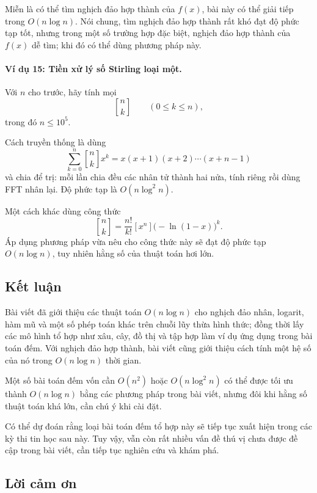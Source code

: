 \documentclass[11pt]{article}
\begin{document}
Miễn là có thể tìm nghịch đảo hợp thành của \(f(x)\), bài này có thể giải tiếp
trong \(O(n\log n)\). Nói chung, tìm nghịch đảo hợp thành rất khó đạt độ phức
tạp tốt, nhưng trong một số trường hợp đặc biệt, nghịch đảo hợp thành của
\(f(x)\) dễ tìm; khi đó có thể dùng phương pháp này.

\paragraph{Ví dụ 15: Tiền xử lý số Stirling loại một.}
Với \(n\) cho trước, hãy tính mọi
\[
  \genfrac{[}{]}{0pt}{}{n}{k}\qquad (0\le k\le n),
\]
trong đó \(n\le 10^5\).

Cách truyền thống là dùng
\[
  \sum_{k=0}^n \genfrac{[}{]}{0pt}{}{n}{k}x^k
  =x(x+1)(x+2)\cdots(x+n-1) \tag{10.4}
\]
và chia để trị: mỗi lần chia đều các nhân tử thành hai nửa, tính riêng rồi dùng
FFT nhân lại. Độ phức tạp là \(O(n\log^2 n)\).

Một cách khác dùng công thức
\[
  \genfrac{[}{]}{0pt}{}{n}{k}
  =\frac{n!}{k!}[x^n]\bigl(-\ln(1-x)\bigr)^k. \tag{10.5}
\]
Áp dụng phương pháp vừa nêu cho công thức này sẽ đạt độ phức tạp
\(O(n\log n)\), tuy nhiên hằng số của thuật toán hơi lớn.

\subsection{Kết luận}

Bài viết đã giới thiệu các thuật toán \(O(n\log n)\) cho nghịch đảo nhân,
logarit, hàm mũ và một số phép toán khác trên chuỗi lũy thừa hình thức; đồng
thời lấy các mô hình tổ hợp như xâu, cây, đồ thị và tập hợp làm ví dụ ứng dụng
trong bài toán đếm. Với nghịch đảo hợp thành, bài viết cũng giới thiệu cách
tính một hệ số của nó trong \(O(n\log n)\) thời gian.

Một số bài toán đếm vốn cần \(O(n^2)\) hoặc \(O(n\log^2 n)\) có thể được tối ưu
thành \(O(n\log n)\) bằng các phương pháp trong bài viết, nhưng đôi khi hằng số
thuật toán khá lớn, cần chú ý khi cài đặt.

Có thể dự đoán rằng loại bài toán đếm tổ hợp này sẽ tiếp tục xuất hiện trong
các kỳ thi tin học sau này. Tuy vậy, vẫn còn rất nhiều vấn đề thú vị chưa được
đề cập trong bài viết, cần tiếp tục nghiên cứu và khám phá.

\subsection{Lời cảm ơn}
\end{document}
